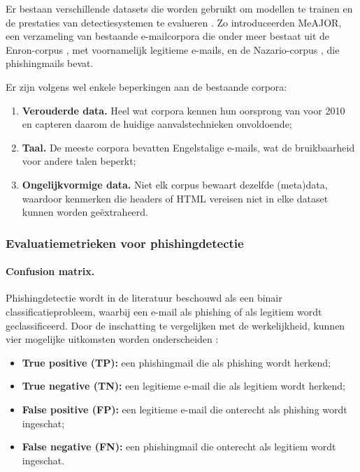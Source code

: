 Er bestaan verschillende datasets die worden gebruikt om modellen te trainen en de prestaties van detectiesystemen te evalueren \autocite{Salloum2022}. Zo introduceerden \textcite{Mendes2025} MeAJOR, een verzameling van bestaande e-mailcorpora die onder meer bestaat uit de Enron-corpus \autocite{klimt2004}, met voornamelijk legitieme e-mails, en de Nazario-corpus , die phishingmails bevat.

Er zijn volgens \textcite{Pajola2025} wel enkele beperkingen aan de bestaande corpora:
\begin{enumerate}
    \item \textbf{Verouderde data.} Heel wat corpora kennen hun oorsprong van voor 2010 en capteren daarom de huidige aanvalstechnieken onvoldoende;
    \item \textbf{Taal.} De meeste corpora bevatten Engelstalige e-mails, wat de bruikbaarheid voor andere talen beperkt;
    \item \textbf{Ongelijkvormige data.} Niet elk corpus bewaart dezelfde (meta)data, waardoor kenmerken die headers of HTML vereisen niet in elke dataset kunnen worden geëxtraheerd.
\end{enumerate}

\subsubsection{Evaluatiemetrieken voor phishingdetectie}
\label{subsubsec:evaluatiemetrieken}

\paragraph{Confusion matrix.}
Phishingdetectie wordt in de literatuur beschouwd als een binair classificatieprobleem, waarbij een e-mail als phishing of als legitiem wordt geclassificeerd. Door de inschatting te vergelijken met de werkelijkheid, kunnen vier mogelijke uitkomsten worden onderscheiden \autocite{Powers2020}:

\begin{itemize}
    \item \textbf{True positive (TP):} een phishingmail die als phishing wordt herkend;
    \item \textbf{True negative (TN):} een legitieme e-mail die als legitiem wordt herkend;
    \item \textbf{False positive (FP):} een legitieme e-mail die onterecht als phishing wordt ingeschat;
    \item \textbf{False negative (FN):} een phishingmail die onterecht als legitiem wordt ingeschat.
\end{itemize}


